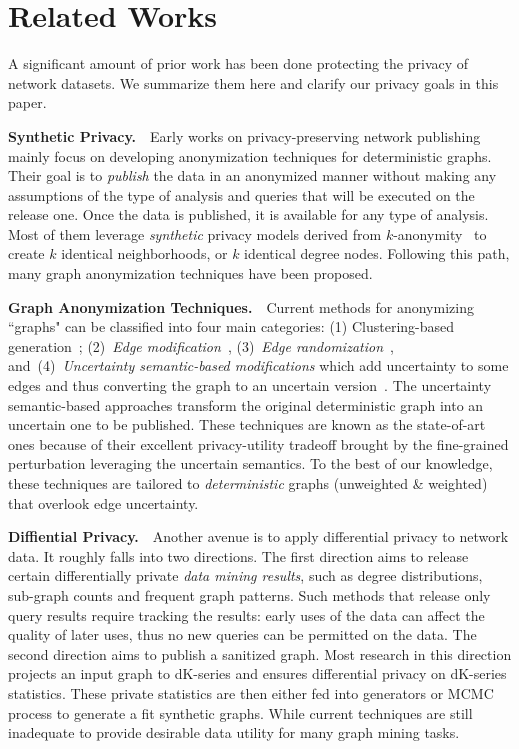 \section{Related Works}
A significant amount of prior work has been done protecting the privacy of network datasets.
We summarize them here and clarify our privacy goals in this paper. 

\textbf{Synthetic Privacy.}~~Early works on privacy-preserving network publishing mainly focus on developing anonymization techniques for deterministic graphs. Their goal is to \emph{publish} the data in an anonymized manner without making any assumptions of the type of analysis and queries that will be executed on the release one. Once the data is published, it is available for any type of analysis. Most of them leverage \emph{synthetic} privacy models derived from $k$-anonymity~\cite{Sweeney:2002:KAM:774544.774552} to create $k$ identical neighborhoods, or $k$ identical degree nodes. Following this path, many graph anonymization techniques have been proposed.

\textbf{Graph Anonymization Techniques.}~~Current methods for anonymizing ``graphs" can be classified into four main categories: (1) Clustering-based generation~\cite{Hay_Anonymizing_2007,Bhagat_Class_2009,hay2010resisting}; (2)~{\em Edge modification}~\cite{Liu_Towards_2008, Zhou_Preserving_2008, Wang2011, Wu_k_2010, Skarkala_Privacy_2012}, 
(3)~{\em Edge randomization}~\cite{Liu_Privacy_2009,Ying_Randomizing_2008, Ninggal_Utility_2015},
and~(4)~{\em Uncertainty semantic-based modifications} which add uncertainty to some edges and thus converting the graph to an uncertain version~\cite{Boldi_Injecting_2012, Nguyen_Anonymizing_2015}. The uncertainty semantic-based approaches transform the original deterministic graph into an uncertain one to be published. These techniques are known as the state-of-art ones because of their excellent privacy-utility tradeoff brought by the fine-grained perturbation leveraging the uncertain semantics. To the best of our knowledge, these techniques are tailored to \emph{deterministic} graphs (unweighted \& weighted) that overlook edge uncertainty.  

\textbf{Diffiential Privacy.}~~Another avenue is to apply differential privacy to network data. It roughly falls into two directions. The first direction aims to release certain differentially private \emph{data mining results}, such as degree distributions, sub-graph counts and frequent graph patterns. Such methods that release only query results require tracking the results: early uses of the data can affect the quality of later uses, thus no new queries can be permitted on the data.  
The second direction aims to publish a sanitized graph. Most research in this direction projects an input graph to dK-series and ensures differential privacy on dK-series statistics. These private statistics are then either fed into generators or MCMC process to generate a fit synthetic graphs. While current techniques are still inadequate to provide desirable data utility for many graph mining tasks. 


